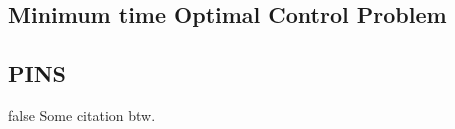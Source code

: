 % 




\subsection{Minimum time Optimal Control Problem}


\subsection{PINS}

% 

\if false
Some citation btw.
\cite{bertolazzi2005symbolic}
\cite{bertolazzi2006symbolic}
\cite{biral2016notes}
\cite{cossalter2006motorcycle}
\cite{dal2019comparison}
\cite{guiggiani2014science}
\cite{lot2014curvilinear,pacejka2006tyre}

\cite{pacejka2006tyre}
\cite{rao2009survey}
\cite{rodrigues2014optimal}
\cite{sharp2004advances}
\cite{sharp2014method}

\fi